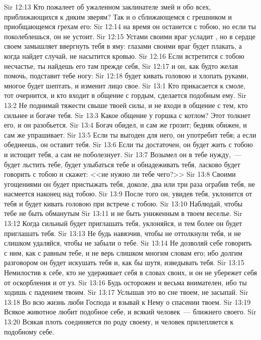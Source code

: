 \vs Sir 12:13 Кто пожалеет об ужаленном заклинателе змей и обо всех, приближающихся к диким зверям? Так и о сближающемся с грешником и приобщающемся грехам его:
\vs Sir 12:14 на время он останется с тобою, но если ты поколеблешься, он не устоит.
\vs Sir 12:15 Устами своими враг усладит , но в сердце своем замышляет ввергнуть тебя в яму: глазами своими враг будет плакать, а когда найдет случай, не насытится кровью.
\vs Sir 12:16 Если встретится с тобою несчастье, ты найдешь его там прежде себя,
\vs Sir 12:17 и он, как будто желая помочь, подставит тебе ногу:
\vs Sir 12:18 будет кивать головою и хлопать руками, многое будет шептать, и изменит лицо свое.
\vs Sir 13:1 Кто прикасается к смоле, тот очернится, и кто входит в общение с гордым, сделается подобным ему.
\vs Sir 13:2 Не поднимай тяжести свыше твоей силы, и не входи в общение с тем, кто сильнее и богаче тебя.
\vs Sir 13:3 Какое общение у горшка с котлом? Этот толкнет его, и он разобьется.
\vs Sir 13:4 Богач обидел, и сам же грозит; бедняк обижен, и сам же упрашивает.
\vs Sir 13:5 Если ты выгоден для него, он употребит тебя; а если обеднеешь, он оставит тебя.
\vs Sir 13:6 Если ты достаточен, он будет жить с тобою и истощит тебя, а сам не поболезнует.
\vs Sir 13:7 Возымел он в тебе нужду,~--- будет льстить тебе, будет улыбаться тебе и обнадеживать тебя, ласково будет говорить с тобою и скажет: <<не нужно ли тебе чего?>>
\vs Sir 13:8 Своими угощениями он будет пристыжать тебя, доколе, два или три раза ограбив тебя, не насмеется наконец над тобою.
\vs Sir 13:9 После того он, увидев тебя, уклонится от тебя и будет кивать головою при встрече с тобою.
\vs Sir 13:10 Наблюдай, чтобы тебе не быть обманутым
\vs Sir 13:11 и не быть униженным в твоем веселье.
\vs Sir 13:12 Когда сильный будет приглашать тебя, уклоняйся, и тем более он будет приглашать тебя.
\vs Sir 13:13 Не будь навязчив, чтобы не оттолкнули тебя, и не слишком удаляйся, чтобы не забыли о тебе.
\vs Sir 13:14 Не дозволяй себе говорить с ним, как с равным тебе, и не верь слишком многим словам его; ибо долгим разговором он будет искушать тебя и, как бы шутя, изведывать тебя.
\vs Sir 13:15 Немилостив к себе, кто не удерживает себя в словах своих, и он не убережет себя от оскорбления и от уз.
\vs Sir 13:16 Будь осторожен и весьма внимателен, ибо ты ходишь с падением твоим.
\vs Sir 13:17 Услышав это во сне твоем, не засыпай.
\vs Sir 13:18 Во всю жизнь люби Господа и взывай к Нему о спасении твоем.
\vs Sir 13:19 Всякое животное любит подобное себе, и всякий человек~--- ближнего своего.
\vs Sir 13:20 Всякая плоть соединяется по роду своему, и человек прилепляется к подобному себе.
